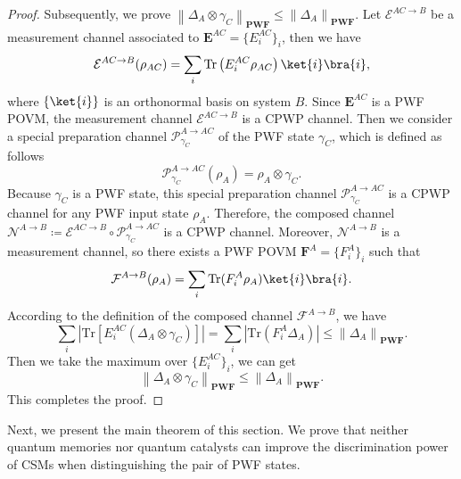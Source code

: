 \documentclass[aps,pra,twocolumn,floatfix,amsfonts,10pt]{revtex4-2}
\begin{document}
\begin{proof}
	Subsequently, we prove $\left\|\Delta_A\otimes\gamma_C\right\|_{\mathbf{PWF}} \leqslant \left\|\Delta_A\right\|_{\mathbf{PWF}}$. 
	Let $\mathcal{E}^{AC\rightarrow B}$ be a measurement channel associated to $\mathbf{E}^{AC}=\{E_i^{AC}\}_i$, then we have
	\begin{equation}
		\mathcal{E}^{AC\rightarrow B}(\rho_{AC}) = \sum_i \mathrm{Tr}\left(E_i^{AC}\rho_{AC}\right)\ket{i}\bra{i},
	\end{equation}
	where $\{\ket{i}\}$ is an orthonormal basis on system $B$.
	Since $\mathbf{E}^{AC}$ is a PWF POVM, the measurement channel $\mathcal{E}^{AC\rightarrow B}$ is a CPWP channel.
	Then we consider a special preparation channel $\mathcal{P}_{\gamma_C}^{A\rightarrow AC}$ of the PWF state $\gamma_C$, which is defined as follows
	\begin{equation}
		\mathcal{P}_{\gamma_C}^{A\rightarrow AC}(\rho_A) = \rho_A \otimes\gamma_C.
	\end{equation}
	Because $\gamma_C$ is a PWF state, this special preparation channel $\mathcal{P}_{\gamma_C}^{A\rightarrow AC}$ is a CPWP channel for any PWF input state $\rho_A$. 
	Therefore, the composed channel $\mathcal{N}^{A\rightarrow B} \coloneqq \mathcal{E}^{AC\rightarrow B}\circ \mathcal{P}_{\gamma_C}^{A\rightarrow AC}$ is a CPWP channel. 
	Moreover, $\mathcal{N}^{A\rightarrow B}$ is a measurement channel, so there exists a PWF POVM $\mathbf{F}^A=\{F_i^A\}_i$ such that
	\begin{equation}
		\mathcal{F}^{A\rightarrow B}(\rho_A) = \sum_i \mathrm{Tr}(F_i^A \rho_A)\ket{i}\bra{i}.
	\end{equation}
	According to the definition of the composed channel $\mathcal{F}^{A\rightarrow B}$, we have
	\begin{equation}
		\sum_i \left|\mathrm{Tr}\left[E_i^{AC}(\Delta_A\otimes\gamma_C) \right] \right| = \sum_i \left| \mathrm{Tr}(F_i^A\Delta_A) \right| \leqslant \left\|\Delta_A\right\|_{\mathbf{PWF}}.
	\end{equation}
	Then we take the maximum over $\{E_i^{AC}\}_i$, we can get
	\begin{equation}
		\left\|\Delta_A\otimes\gamma_C\right\|_{\mathbf{PWF}} \leqslant \left\|\Delta_A\right\|_{\mathbf{PWF}}.
	\end{equation}
		This completes the proof.
\end{proof}

Next, we present the main theorem of this section. 
We prove that neither quantum memories nor quantum catalysts can improve the discrimination power of CSMs when distinguishing the pair of PWF states.
\end{document}
